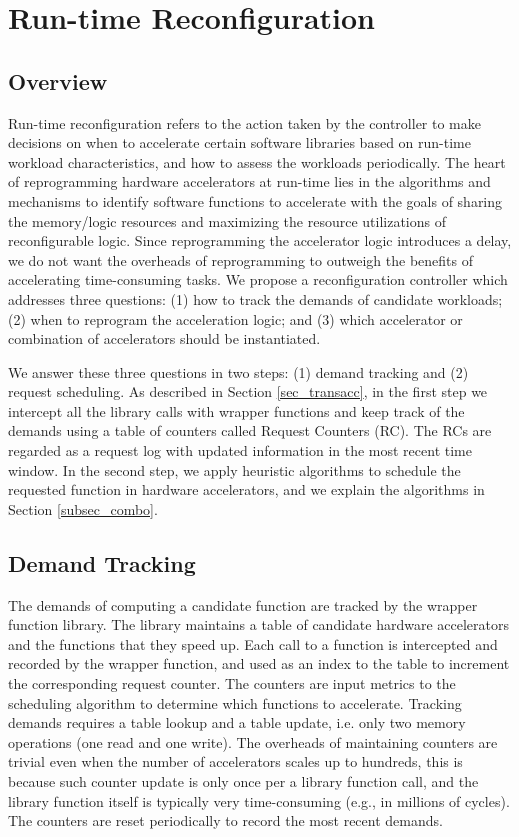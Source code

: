 \section{Run-time Reconfiguration }
\label{sec_runtime_reconfig}

\subsection{Overview}
\label{subsec_runtime_reconfig_overview}

Run-time reconfiguration refers to the action taken by the controller
to make decisions on when to accelerate certain software libraries
based on run-time workload characteristics, and how to assess the
workloads periodically. The heart of reprogramming hardware
accelerators at run-time lies in the algorithms and mechanisms to
identify software functions to accelerate with the goals of sharing
the memory/logic resources and maximizing the resource utilizations of
reconfigurable logic. Since reprogramming the accelerator logic 
introduces a delay, we do not want the overheads of
reprogramming to outweigh the benefits of accelerating time-consuming
tasks. We propose a reconfiguration controller which addresses three
questions: (1) how to track the demands of candidate workloads; (2)
when to reprogram the acceleration logic; and (3) which accelerator
or combination of accelerators should be instantiated.


We answer these three questions in two steps:
(1) demand tracking and (2) request scheduling. As described in
Section \ref{sec_transacc}, in the first step we intercept all the
library calls with wrapper functions and keep track of the demands
using a table of counters called Request Counters (RC). The RCs
are regarded as a request log with updated information in the most
recent time window. In the second step, we apply heuristic algorithms to
schedule the requested function in hardware accelerators, and we
explain the algorithms in Section \ref{subsec_combo}. 

\subsection{Demand Tracking} 

The demands of computing a candidate function are tracked by the
wrapper function library. The library maintains a table of candidate
hardware accelerators and the functions that they speed up. Each call
to a function is intercepted and recorded by the wrapper function, and used as an
index to the table to increment the corresponding request counter. The
counters are input metrics to the scheduling algorithm to determine which
functions to accelerate. Tracking demands requires a table
lookup and a table update, i.e. only two memory operations (one
read and one write). The overheads of maintaining counters are trivial even when the number
of accelerators scales up to hundreds, this is because such counter
update is only once per a library function call, and the library function itself is typically very time-consuming (e.g., in millions of cycles). The counters
are reset periodically to record the most recent demands. 


